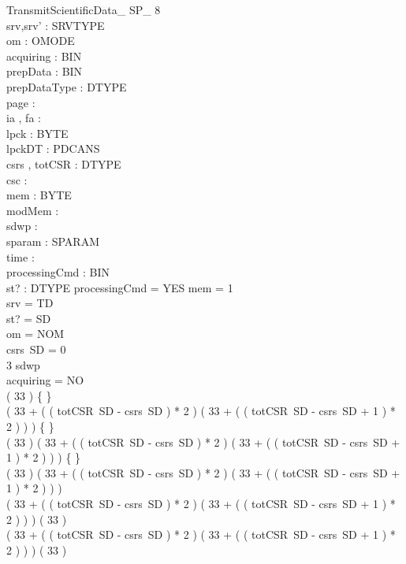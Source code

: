 \begin{schema}{TransmitScientificData\_ SP\_ 8}\\
 srv,srv' : SRVTYPE \\
 om : OMODE \\
 acquiring : BIN \\
 prepData : BIN \\
 prepDataType : DTYPE \\
 page : \nat \\
 ia , fa : \nat \\
 lpck : \seq BYTE \\
 lpckDT : PDCANS \\
 csrs , totCSR : DTYPE \fun \nat \\
 csc : \nat \\
 mem : \nat \pfun BYTE \\
 modMem : \power \nat \\
 sdwp : \nat \\
 sparam : SPARAM \fun \nat \\
 time : \nat \\
 processingCmd : BIN \\
 st? : DTYPE 
\where
 processingCmd = YES \land \dom mem = 1  \\
 srv = TD \\
 st? = SD \\
 om = NOM \\
 csrs~SD = 0 \\
 3 \leq sdwp \\
 acquiring = NO \\
 ( 33  ) \neq \{ \} \\
 ( 33 + ( ( totCSR~SD - csrs~SD ) * 2 ) \upto ( 33 + ( ( totCSR~SD - csrs~SD + 1 ) * 2 ) ) ) \neq \{ \} \\
 ( 33  ) \cap ( 33 + ( ( totCSR~SD - csrs~SD ) * 2 ) \upto ( 33 + ( ( totCSR~SD - csrs~SD + 1 ) * 2 ) ) ) \neq \{ \} \\
 \lnot ( 33  ) \subseteq ( 33 + ( ( totCSR~SD - csrs~SD ) * 2 ) \upto ( 33 + ( ( totCSR~SD - csrs~SD + 1 ) * 2 ) ) ) \\
 \lnot ( 33 + ( ( totCSR~SD - csrs~SD ) * 2 ) \upto ( 33 + ( ( totCSR~SD - csrs~SD + 1 ) * 2 ) ) ) \subseteq ( 33  ) \\
 ( 33 + ( ( totCSR~SD - csrs~SD ) * 2 ) \upto ( 33 + ( ( totCSR~SD - csrs~SD + 1 ) * 2 ) ) ) \neq ( 33  )
\end{schema}

